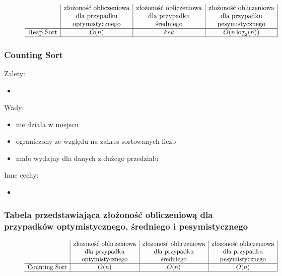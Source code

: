 \documentclass[polish,polish,a4paper]{article}
\begin{document}
\begin{spacing}{1.5}
\begin{figure}[H]
\begin{equation*}
\begin{array}{l|c|c|c|}
	&$złożoność obliczeniowa$&$złożoność obliczeniowa$&$złożoność obliczeniowa$\\
	&$dla przypadku$&$dla przypadku$&$dla przypadku$\\
	&$optymistycznego$&$średniego$&$pesymistycznego$\\
	\hline
	$Heap Sort$&O(n)&kek&O(n\log_{2}(n))\\
	\hline
	\end{array}
	\end{equation*}
\end{figure}

			\subsubsection*{Counting Sort}
Zalety:
\begin{itemize}
	\item 
\end{itemize}
Wady:
\begin{itemize}
	\item nie działa w miejscu
	\item ograniczony ze względu na zakres sortowanych liczb
	\item mało wydajny dla danych z dużego przedziału
\end{itemize}
Inne cechy:
\begin{itemize}
	\item 
\end{itemize}

\subsubsection*{Tabela przedstawiająca złożoność obliczeniową dla przypadków optymistycznego, średniego i pesymistycznego} 
\begin{figure}[H]
	
	\begin{equation*}
	\begin{array}{l|c|c|c|}

	&$złożoność obliczeniowa$&$złożoność obliczeniowa$&$złożoność obliczeniowa$\\
	&$dla przypadku$&$dla przypadku$&$dla przypadku$\\
	&$optymistycznego$&$średniego$&$pesymistycznego$\\
	\hline
	$Counting Sort$&O(n)&O(n)&O(n)\\
	\hline
	\end{array}
	\end{equation*}
\end{figure}


\end{spacing}
\end{document}
